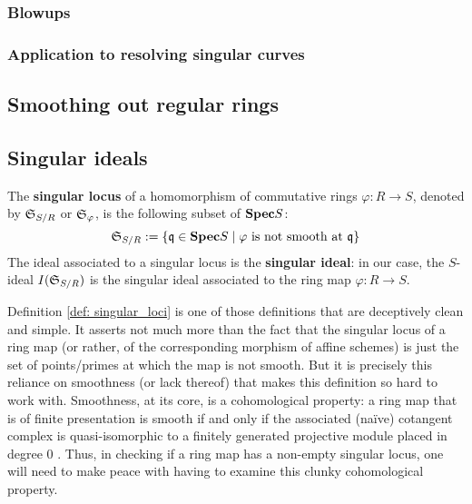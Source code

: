             \subsubsection{Blowups}
            
            \subsubsection{Application to resolving singular curves}
        
        \subsection{Smoothing out regular rings}
            \subsection{Singular ideals}
                \begin{definition} \label{def: singular_loci}
                    The \textbf{singular locus} of a homomorphism of commutative rings $\varphi: R \to S$, denoted by $\mathfrak{S}_{S/R}$ or $\mathfrak{S}_{\varphi}$, is the following subset of $\mathbf{Spec} S$:
                        $$\mathfrak{S}_{S/R} := \{\mathfrak{q} \in \mathbf{Spec} S \mid \text{$\varphi$ is not smooth at $\mathfrak{q}$}\}$$
                    The ideal associated to a singular locus is the \textbf{singular ideal}: in our case, the $S$-ideal $I(\mathfrak{S}_{S/R})$ is the singular ideal associated to the ring map $\varphi: R \to S$.
                \end{definition}
                \begin{remark}
                    Definition \ref{def: singular_loci} is one of those definitions that are deceptively clean and simple. It asserts not much more than the fact that the singular locus of a ring map (or rather, of the corresponding morphism of affine schemes) is just the set of points/primes at which the map is not smooth. But it is precisely this reliance on smoothness (or lack thereof) that makes this definition so hard to work with. Smoothness, at its core, is a cohomological property: a ring map that is of finite presentation is smooth if and only if the associated (na\"ive) cotangent complex is quasi-isomorphic to a finitely generated projective module placed in degree $0$ \cite[\href{https://stacks.math.columbia.edu/tag/00T2}{Tag 00T2}]{stacks}. Thus, in checking if a ring map has a non-empty singular locus, one will need to make peace with having to examine this clunky cohomological property.  
                \end{remark}
                

